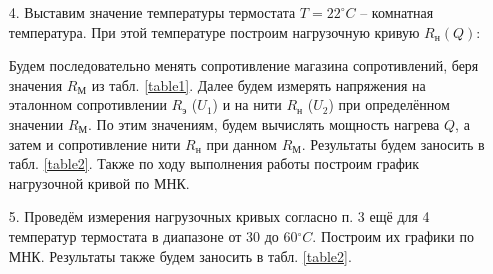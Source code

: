 \documentclass[a4paper, 12pt]{article}
\begin{document}
\begin{enumerate}
        \item[4.] Выставим значение температуры термостата $T = 22^\circ C$ – комнатная температура. При этой температуре построим нагрузочную кривую $R_н(Q)$:
        
        Будем последовательно менять сопротивление магазина сопротивлений, беря значения $R_М$ из табл. \ref{table1}. Далее будем измерять напряжения на эталонном сопротивлении $R_э$ ($U_1$) и на нити $R_н$ ($U_2$) при определённом значении $R_М$. По этим значениям, будем вычислять мощность нагрева $Q$, а затем и сопротивление нити $R_н$ при данном $R_М$. Результаты будем заносить в табл. \ref{table2}. Также по ходу выполнения работы построим график нагрузочной кривой по МНК.
        
        \item[5.] Проведём измерения нагрузочных кривых согласно п. 3 ещё для 4 температур термостата в диапазоне от 30 до 60$^\circ C$. Построим их графики по МНК. Результаты также будем заносить в табл. \ref{table2}.
        
    \end{enumerate}
\end{document}
